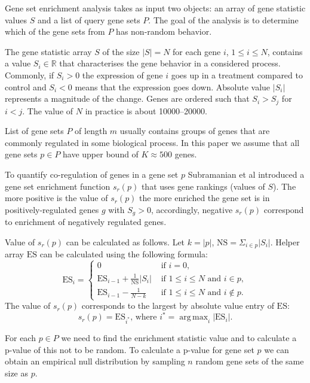 \documentclass[runningheads,a4paper]{llncs}
\DeclareMathOperator*{\argmax}{arg\,max}
\begin{document}
Gene set enrichment analysis takes as input two objects:
an array of gene statistic values $S$ and a list of query gene sets $P$.
The goal of the analysis is to determine which of the gene sets from $P$
has non-random behavior.

The gene statistic array $S$ of the size $|S| = N$ for each gene
$i$,  $1 \le i \le N$, contains a value $S_i \in \mathbb{R}$ 
that characterises the gene behavior in a considered process.
Commonly, if $S_i > 0$ the expression of gene $i$ goes up in a treatment
compared to 
control and $S_i < 0$ means that the expression goes down. Absolute value 
$|S_i|$ represents a magnitude of the change. Genes are ordered such that
$S_i > S_j$ for $i < j$. The value of $N$ in practice is about 10000--20000.

List of gene sets $P$ of length $m$ usually contains groups of 
genes that are commonly regulated in some biological process.
In this
paper we assume that all gene sets $p \in P$ have upper bound
of $K \approx 500$ genes.

To quantify co-regulation of genes in a gene set $p$ Subramanian et al
introduced a gene set enrichment function $s_r(p)$ that uses
gene rankings (values of $S$).
The more positive is the value of 
$s_r(p)$ the more enriched the gene set is in positively-regulated
genes $g$ with $S_g > 0$, accordingly, negative $s_r(p)$ correspond
to enrichment of negatively regulated genes.

Value of $s_r(p)$ can be calculated as follows. Let $k = |p|$, 
$\mathrm{NS} = \Sigma_{i \in p} |S_i|$. Helper array $\mathrm{ES}$
can be calculated using the following formula: 
\[ \mathrm{ES}_i = \begin{cases} 
        0 & \text{ if } i = 0, \\
        \mathrm{ES}_{i-1} + \frac{1}{\mathrm{NS}} |S_i| & \text{ if } 1 \le i \le N  \text{ and } i \in p, \\
        \mathrm{ES}_{i-1} - \frac{1}{N-k} & \text{ if } 1 \le i \le N \text{ and } i \not \in p.
   \end{cases}
\]
The value of $s_r(p)$ corresponds to the largest by absolute value entry
of $\mathrm{ES}$:
\[
s_r(p) = \mathrm{ES}_{i^*} \text{, where } i^* =  \argmax_i |\mathrm{ES}_i|.
\]

For each $p \in P$ we need to find the enrichment statistic value
and to calculate a p-value of this not to be random. 
To calculate a p-value for gene set $p$ we can obtain an empirical 
null distribution
by sampling $n$ random gene sets of the same size as $p$. 
\end{document}

